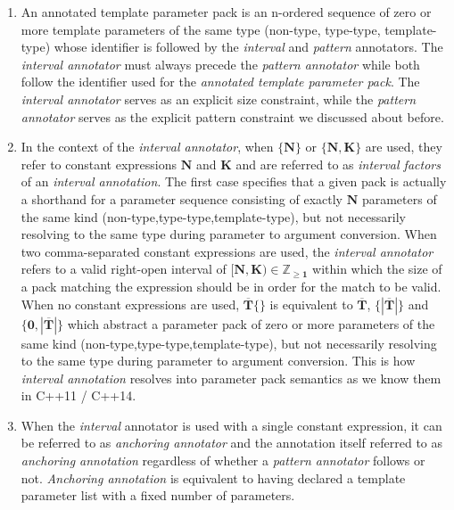 \begin{enumerate}
\item\p An annotated template parameter pack is an n-ordered sequence of zero or more template parameters of the same type (non-type, type-type, template-type) whose identifier is followed by the \textit{interval} and \textit{pattern} annotators.
The \textit{interval annotator} must always precede the \textit{pattern annotator} while both follow the identifier used for the \textit{annotated template parameter pack}.
The \textit{interval annotator} serves as an explicit size constraint, while the \textit{pattern annotator} serves as the explicit pattern constraint we discussed about before.

\item\p In the context of the \textit{interval annotator}, when $\bm{\{N\}}$ or $\bm{\{N,K\}}$ are used, they refer to constant expressions $\bm{N}$ and $\bm{K}$ and are referred to as \textit{interval factors} of an \textit{interval annotation}.
The first case specifies that a given pack is actually a shorthand for a parameter sequence consisting of exactly $\bm{N}$ parameters of the same kind (non-type,type-type,template-type), but not necessarily resolving to the same type during parameter to argument conversion.
When two comma-separated constant expressions are used, the \textit{interval annotator} refers to a valid right-open interval of $\bm{[N,K)\in\mathbb{Z}_{\geq 1}}$ within which the size of a pack matching the expression should be in order for the match to be valid.
When no constant expressions are used, $\bm{\overline{T}\{\}}$ is equivalent to $\bm{\overline{T}}$, $\bm{\{|\overline{T}|\}}$ and $\bm{\{0,|\overline{T}|\}}$ which abstract a parameter pack of zero or more parameters of the same kind (non-type,type-type,template-type), but not necessarily resolving to the same type during parameter to argument conversion.
This is how \textit{interval annotation} resolves into parameter pack semantics as we know them in C++11 / C++14.

\item\p When the \textit{interval} annotator is used with a single constant expression, it can be referred to as \textit{anchoring annotator} and the annotation itself referred to as \textit{anchoring annotation} regardless of whether a \textit{pattern annotator} follows or not.
\textit{Anchoring annotation} is equivalent to having declared a template parameter list with a fixed number of parameters.


\end{enumerate}
